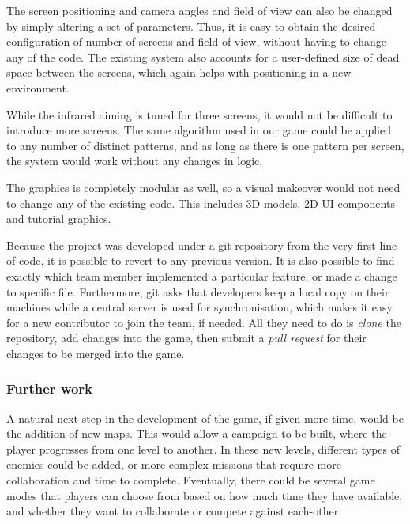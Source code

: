 \documentclass[a4paper,11pt]{article}
\begin{document}
The screen positioning and camera angles and field of view can also be changed by simply altering a set of parameters. Thus, it is easy to obtain the desired configuration of number of screens and field of view, without having to change any of the code. The existing system also accounts for a user-defined size of dead space between the screens, which again helps with positioning in a new environment.

While the infrared aiming is tuned for three screens, it would not be difficult to introduce more screens. The same algorithm used in our game could be applied to any number of distinct patterns, and as long as there is one pattern per screen, the system would work without any changes in logic.

The graphics is completely modular as well, so a visual makeover would not need to change any of the existing code. This includes 3D models, 2D UI components and tutorial graphics.

Because the project was developed under a git repository from the very first line of code, it is possible to revert to any previous version. It is also possible to find exactly which team member implemented a particular feature, or made a change to specific file. Furthermore, git asks that developers keep a local copy on their machines while a central server is used for synchronisation, which makes it easy for a new contributor to join the team, if needed. All they need to do is \emph{clone} the repository, add changes into the game, then submit a \emph{pull request} for their changes to be merged into the game.

\subsubsection{Further work}


A natural next step in the development of the game, if given more time, would be the addition of new maps. This would allow a campaign to be built, where the player progresses from one level to another. In these new levels, different types of enemies could be added, or more complex missions that require more collaboration and time to complete. Eventually, there could be several game modes that players can choose from based on how much time they have available, and whether they want to collaborate or compete against each-other.
\end{document}
